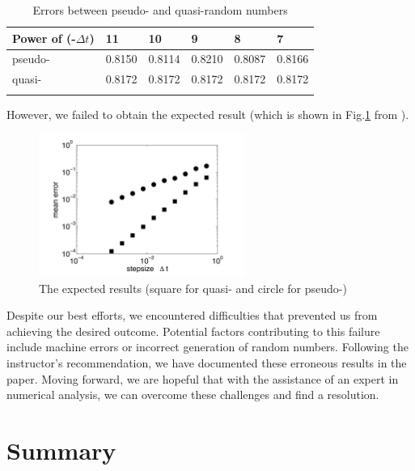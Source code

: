\documentclass[12pt,a4paper]{article}
\theoremstyle{definition}
\begin{document}
\begin{longtable}[c]{llllll}
\hline
\textbf{Power of (-$\Delta t$)} & \textbf{11} & \textbf{10} & \textbf{9} & \textbf{8} & \textbf{7} \\ \hline
\endfirsthead
%
\endhead
%
pseudo-                       & 0.8150      & 0.8114      & 0.8210     & 0.8087     & 0.8166     \\
quasi-                        & 0.8172      & 0.8172      & 0.8172     & 0.8172     & 0.8172    \\ \hline
\caption{Errors between pseudo- and quasi-random numbers}
\label{tb2}\\
\end{longtable}

However, we failed to obtain the expected result (which is shown in Fig.\ref{fig16} from \cite{sauer}). 

\begin{figure}[htbp]
\centering
\includegraphics[width=0.6\textwidth]{fig/fig16.png}
\caption{\label{fig16} The expected results (square for quasi- and circle for pseudo-)}
\end{figure}


Despite our best efforts, we encountered difficulties that prevented us from achieving the desired outcome. Potential factors contributing to this failure include machine errors or incorrect generation of random numbers. Following the instructor's recommendation, we have documented these erroneous results in the paper. Moving forward, we are hopeful that with the assistance of an expert in numerical analysis, we can overcome these challenges and find a resolution.

\section{Summary}
\newpage
\printbibliography
\end{document}
